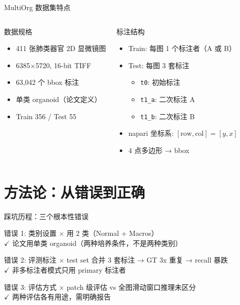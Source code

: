 \documentclass[aspectratio=169, 11pt]{beamer}
\begin{document}
\begin{frame}{MultiOrg 数据集特点}
  \begin{columns}[T]
    \begin{block}{数据规格}
      \begin{itemize}
        \item 411 张肺类器官 2D 显微镜图
        \item 6385$\times$5720, 16-bit TIFF
        \item 63,042 个 bbox 标注
        \item 单类 organoid（论文定义）
        \item Train 356 / Test 55
      \end{itemize}
    \end{block}
    \begin{block}{标注结构}
      \begin{itemize}
        \item Train: 每图 1 个标注者（A 或 B）
        \item Test: 每图 3 套标注
        \begin{itemize}
          \item \texttt{t0}: 初始标注
          \item \texttt{t1\_a}: 二次标注 A
          \item \texttt{t1\_b}: 二次标注 B
        \end{itemize}
        \item napari 坐标系: $[\text{row}, \text{col}] = [y, x]$
        \item 4 点多边形 → bbox
      \end{itemize}
    \end{block}
  \end{columns}
\end{frame}

\section{方法论：从错误到正确}

\begin{frame}{踩坑历程：三个根本性错误}
  \begin{block}{错误 1: 类别设置}
    \textcolor{accentred}{$\times$} 用 2 类（Normal + Macros）\\
    \textcolor{accentgreen}{$\checkmark$} 论文用单类 organoid（两种培养条件，不是两种类别）
  \end{block}
  \begin{block}{错误 2: 评测标注}
    \textcolor{accentred}{$\times$} test set 合并 3 套标注 → GT 3x 重复 → recall 暴跌\\
    \textcolor{accentgreen}{$\checkmark$} 非多标注者模式只用 primary 标注者
  \end{block}
  \begin{block}{错误 3: 评估方式}
    \textcolor{accentred}{$\times$} patch 级评估 vs 全图滑动窗口推理未区分\\
    \textcolor{accentgreen}{$\checkmark$} 两种评估各有用途，需明确报告
  \end{block}
\end{frame}
\end{document}
